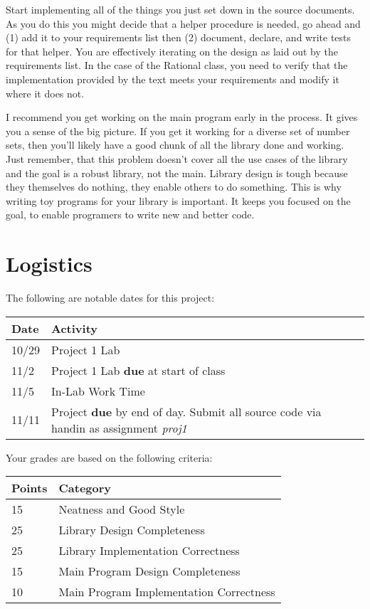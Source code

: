\documentclass[10pt]{article}
\begin{document}
Start implementing all of the things you just set down in the source documents. As you do this you might decide that a helper procedure is needed, go ahead and (1) add it to your requirements list then (2) document, declare, and write tests for that helper. You are effectively iterating on the design as laid out by the requirements list. In the case of the Rational class, you need to verify that the implementation provided by the text meets your requirements and modify it where it does not. 

I recommend you get working on the main program early in the process. It gives you a sense of the big picture. If you get it working for a diverse set of number sets, then you'll likely have a good chunk of all the library done and working. Just remember, that this problem doesn't cover all the use cases of the library and the goal is a robust library, not the main. Library design is tough because they themselves do nothing, they enable others to do something. This is why writing toy programs for your library is important. It keeps you focused on the goal, to enable programers to write new and better code.          

\section{Logistics}

The following are notable dates for this project:
\begin{center}
\begin{tabular}{ll}
Date & Activity \\ \hline
10/29 & Project 1 Lab \\
11/2 & Project 1 Lab \textbf{due} at start of class \\
11/5 & In-Lab Work Time \\
11/11 & Project \textbf{due} by end of day. Submit all source code via handin as assignment \textit{proj1} 
\end{tabular}
\end{center}

Your grades are based on the following criteria:
\begin{center}
\begin{tabular}{ll}
Points & Category \\ \hline
15  & Neatness and Good Style \\
25  & Library Design Completeness \\
25  & Library Implementation Correctness \\
15  & Main Program Design Completeness \\
10  & Main Program Implementation Correctness     
\end{tabular}
\end{center}
\end{document}
